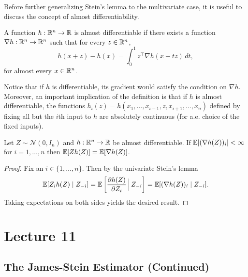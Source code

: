 \noindent Before further generalizing Stein's lemma to the multivariate case, it is useful to discuss the concept of almost differentiability. 

\begin{definition}
	A function $h : \mathbb{R}^n \to \mathbb{R}$ is almost differentiable if there exists a function $\nabla h : \mathbb{R}^n \to \mathbb{R}^n$ such that for every $z \in \mathbb{R}^n$, \[
		h(x + z) - h(x) = \int_{0}^{1} z^\top \nabla h(x + tz) \, dt,
	\] for almost every $x \in \mathbb{R}^n$.
	
\end{definition}

\begin{remark}
	Notice that if $h$ is differentiable, its gradient would satisfy the condition on $\nabla h$. Moreover, an important implication of the definition is that if $h$ is almost differentiable, the functions $h_i(z) = h(x_1, \dots, x_{i-1}, z, x_{i+1}, \dots, x_n)$ defined by fixing all but the $i$th input to $h$ are absolutely continuous (for a.e. choice of the fixed inputs).
\end{remark}

\begin{theorem}
	Let $Z \sim \mathcal{N}(0, I_n)$ and $h : \mathbb{R}^n \to \mathbb{R}$ be almost differentiable. If $\mathbb{E} |(\nabla h(Z))_i| < \infty$ for $i = 1, \dots, n$ then $\mathbb{E}[Z h(Z)] = \mathbb{E}[\nabla h(Z)]$.
\end{theorem}

\begin{proof}
	Fix an $i \in \{1, \dots, n\}$. Then by the univariate Stein's lemma \[
		\mathbb{E}[Z_i h(Z) \mid Z_{-i}] = \mathbb{E}\left[\frac{\partial h(Z)}{\partial Z_i} \,\Big |\, Z_{-i}\right] = \mathbb{E}[(\nabla h(Z))_i \mid Z_{-i}].
	\] Taking expectations on both sides yields the desired result.
\end{proof}



\newpage
\section{Lecture 11}

\subsection{The James-Stein Estimator (Continued)}

